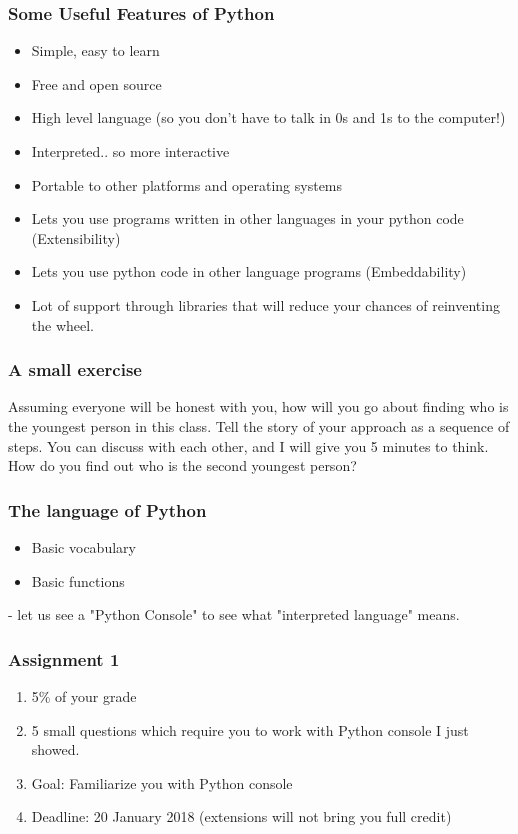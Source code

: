 \documentclass{beamer}
\begin{document}
\begin{frame}
\frametitle{Some Useful Features of Python}
\begin{itemize}
\item Simple, easy to learn
\item Free and open source
\item High level language (so you don't have to talk in 0s and 1s to the computer!)
\item Interpreted.. so more interactive
\item Portable to other platforms and operating systems
\item Lets you use programs written in other languages in your python code (Extensibility)
\item Lets you use python code in other language programs (Embeddability)
\item Lot of support through libraries that will reduce your chances of reinventing the wheel.
\end{itemize}
\end{frame}


\begin{frame}
\frametitle{A small exercise}
\begin{center}
Assuming everyone will be honest with you, how will you go about finding who is the youngest person in this class. Tell the story of your approach as a sequence of steps. You can discuss with each other, and I will give you 5 minutes to think. \pause How do you find out who is the second youngest person? 
\end{center}
\end{frame}

\begin{frame}
\frametitle{The language of Python}
\begin{itemize}
\item Basic vocabulary
\item Basic functions
\end{itemize}
- let us see a "Python Console" to see what "interpreted language" means. 
\end{frame}

\begin{frame}
\frametitle{Assignment 1}
\begin{enumerate}
\item 5\% of your grade
\item 5 small questions which require you to work with Python console I just showed.
\item Goal: Familiarize you with Python console
\item Deadline: 20 January 2018 (extensions will not bring you full credit)
\end{enumerate}
\end{frame}
\end{document}
